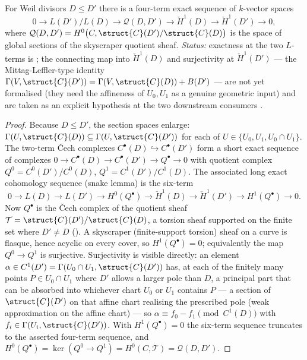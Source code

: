 \begin{proposition}
  \label{thm:adelic_twist_exact_sequence}
  For Weil divisors \(D \le D'\) there is a four-term exact sequence of
  \(k\)-vector spaces
  \[
    0 \longrightarrow L(D')/L(D)
      \longrightarrow \mathcal{Q}(D, D')
      \longrightarrow \check{H}^1(D)
      \longrightarrow \check{H}^1(D')
      \longrightarrow 0,
  \]
  where \(\mathcal{Q}(D, D') = H^0\bigl(C, \struct{C}(D')/\struct{C}(D)\bigr)\)
  is the space of global sections of the skyscraper quotient sheaf.
  \emph{Status:} exactness at the two \(L\)-terms is
  ; the connecting map into
  \(\check{H}^1(D)\) and surjectivity at \(\check{H}^1(D')\) --- the
  Mittag-Leffler-type identity \(\Gamma(V, \struct{C}(D')) = \Gamma(V,
  \struct{C}(D)) + B(D')\) --- are not yet formalised (they need the
  affineness of \(U_0, U_1\) as a genuine geometric input) and are taken
  as an explicit hypothesis at the two downstream consumers
  .
\end{proposition}
\begin{proof}
  Because \(D \le D'\), the section spaces enlarge:
  \(\Gamma(U, \struct{C}(D)) \subseteq \Gamma(U, \struct{C}(D'))\) for
  each of \(U \in \{U_0, U_1, U_0 \cap U_1\}\). The two-term Čech
  complexes \(C^\bullet(D) \hookrightarrow C^\bullet(D')\) form a short
  exact sequence of complexes
  \(0 \to C^\bullet(D) \to C^\bullet(D') \to Q^\bullet \to 0\) with
  quotient complex
  \(Q^0 = C^0(D')/C^0(D)\), \(Q^1 = C^1(D')/C^1(D)\). The associated long
  exact cohomology sequence (snake lemma) is the six-term
  \[
    0 \to L(D) \to L(D') \to H^0(Q^\bullet)
      \to \check{H}^1(D) \to \check{H}^1(D') \to H^1(Q^\bullet) \to 0 .
  \]
  Now \(Q^\bullet\) is the Čech complex of the quotient sheaf
  \(\mathcal{T} = \struct{C}(D')/\struct{C}(D)\), a torsion sheaf
  supported on the finite set where \(D' \ne D\)
  (). A skyscraper (finite-support
  torsion) sheaf on a curve is flasque, hence acyclic on every cover, so
  \(H^1(Q^\bullet) = 0\); equivalently the map \(Q^0 \to Q^1\) is
  surjective. Surjectivity is visible directly: an element
  \(\alpha \in C^1(D') = \Gamma(U_0 \cap U_1, \struct{C}(D'))\) has, at
  each of the finitely many points \(P \in U_0 \cap U_1\) where \(D'\)
  allows a larger pole than \(D\), a principal part that can be absorbed
  into whichever chart \(U_0\) or \(U_1\) contains \(P\) --- a section of
  \(\struct{C}(D')\) on that affine chart realising the prescribed pole
  (weak approximation on the affine chart) --- so
  \(\alpha \equiv f_0 - f_1 \pmod{C^1(D)}\) with
  \(f_i \in \Gamma(U_i, \struct{C}(D'))\). With \(H^1(Q^\bullet) = 0\) the
  six-term sequence truncates to the asserted four-term sequence, and
  \(H^0(Q^\bullet) = \ker(Q^0 \to Q^1) = H^0(C, \mathcal{T}) =
  \mathcal{Q}(D, D')\).
\end{proof}

